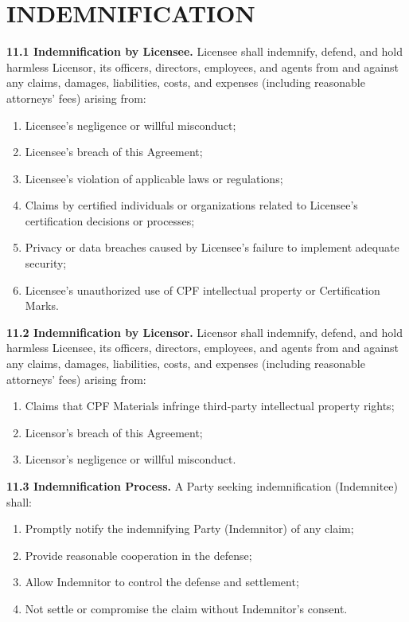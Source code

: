 \documentclass[11pt,a4paper]{article}
\begin{document}
\section{INDEMNIFICATION}

\textbf{11.1 Indemnification by Licensee.} Licensee shall indemnify, defend, and hold harmless Licensor, its officers, directors, employees, and agents from and against any claims, damages, liabilities, costs, and expenses (including reasonable attorneys' fees) arising from:

\begin{enumerate}[label=\alph*)]
\item Licensee's negligence or willful misconduct;
\item Licensee's breach of this Agreement;
\item Licensee's violation of applicable laws or regulations;
\item Claims by certified individuals or organizations related to Licensee's certification decisions or processes;
\item Privacy or data breaches caused by Licensee's failure to implement adequate security;
\item Licensee's unauthorized use of CPF intellectual property or Certification Marks.
\end{enumerate}

\textbf{11.2 Indemnification by Licensor.} Licensor shall indemnify, defend, and hold harmless Licensee, its officers, directors, employees, and agents from and against any claims, damages, liabilities, costs, and expenses (including reasonable attorneys' fees) arising from:

\begin{enumerate}[label=\alph*)]
\item Claims that CPF Materials infringe third-party intellectual property rights;
\item Licensor's breach of this Agreement;
\item Licensor's negligence or willful misconduct.
\end{enumerate}

\textbf{11.3 Indemnification Process.} A Party seeking indemnification (Indemnitee) shall:

\begin{enumerate}[label=\alph*)]
\item Promptly notify the indemnifying Party (Indemnitor) of any claim;
\item Provide reasonable cooperation in the defense;
\item Allow Indemnitor to control the defense and settlement;
\item Not settle or compromise the claim without Indemnitor's consent.
\end{enumerate}
\end{document}

